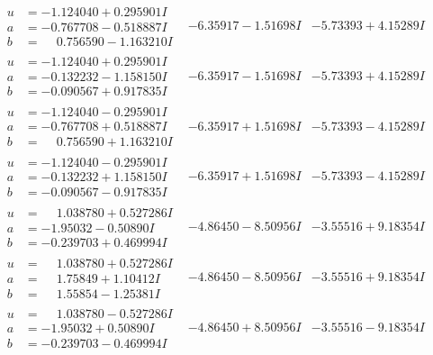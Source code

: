 \documentclass[1p]{elsarticle_modified}
\theoremstyle{definition}
\begin{document}
$$\begin{array}{c|c|c}
\begin{aligned}
u &= -1.124040 + 0.295901 I \\
a &= -0.767708 - 0.518887 I \\
b &= \phantom{-}0.756590 - 1.163210 I\end{aligned}
 & -6.35917 - 1.51698 I & -5.73393 + 4.15289 I \\ \hline\begin{aligned}
u &= -1.124040 + 0.295901 I \\
a &= -0.132232 - 1.158150 I \\
b &= -0.090567 + 0.917835 I\end{aligned}
 & -6.35917 - 1.51698 I & -5.73393 + 4.15289 I \\ \hline\begin{aligned}
u &= -1.124040 - 0.295901 I \\
a &= -0.767708 + 0.518887 I \\
b &= \phantom{-}0.756590 + 1.163210 I\end{aligned}
 & -6.35917 + 1.51698 I & -5.73393 - 4.15289 I \\ \hline\begin{aligned}
u &= -1.124040 - 0.295901 I \\
a &= -0.132232 + 1.158150 I \\
b &= -0.090567 - 0.917835 I\end{aligned}
 & -6.35917 + 1.51698 I & -5.73393 - 4.15289 I \\ \hline\begin{aligned}
u &= \phantom{-}1.038780 + 0.527286 I \\
a &= -1.95032 - 0.50890 I \\
b &= -0.239703 + 0.469994 I\end{aligned}
 & -4.86450 - 8.50956 I & -3.55516 + 9.18354 I \\ \hline\begin{aligned}
u &= \phantom{-}1.038780 + 0.527286 I \\
a &= \phantom{-}1.75849 + 1.10412 I \\
b &= \phantom{-}1.55854 - 1.25381 I\end{aligned}
 & -4.86450 - 8.50956 I & -3.55516 + 9.18354 I \\ \hline\begin{aligned}
u &= \phantom{-}1.038780 - 0.527286 I \\
a &= -1.95032 + 0.50890 I \\
b &= -0.239703 - 0.469994 I\end{aligned}
 & -4.86450 + 8.50956 I & -3.55516 - 9.18354 I \\ \hline\begin{aligned}

\end{aligned}
\end{array}$$
\end{document}

